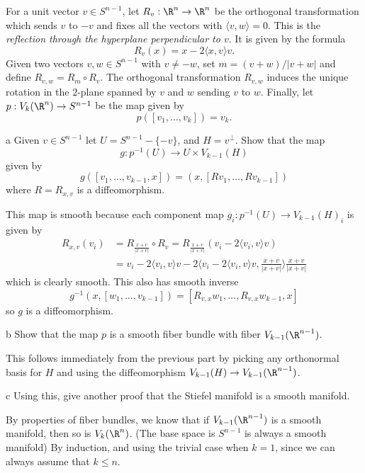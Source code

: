 \documentclass[11pt,letterpaper]{article}
\begin{document}
\begin{solution}
    For a unit vector $v\in S^{n-1}$, let $R_v : \R^n \to \R^n$ be the orthogonal transformation which sends $v$ to $-v$ and fixes all the vectors with $\big\langle v,w \big\rangle = 0$. This is the \emph{reflection through the hyperplane perpendicular to $v$}. It is given by the formula
    \[
        R_v(x) = x - 2\big\langle x,v \big\rangle v
    .\]
    Given two vectors $v,w\in S^{n-1}$ with $v\neq -w$, set $m=(v+w) /|v+w|$ and define $R_{v,w} = R_m\circ R_v$. The orthogonal transformation $R_{v,w}$ induces the unique rotation in the $2$-plane spanned by $v$ and $w$ sending $v$ to $w$. Finally, let $p : V_k(\R^n)\to S^{n-1}$ be the map given by
    \[
        p([v_1,\ldots,v_k])=v_k
    .\]  

    \begin{partproblem}{a}
        Given $v\in S^{n-1}$ let $U=S^{n-1}-\{-v\}$, and $H=v^\perp$. Show that the map
        \[
            g : p^{-1}(U)\to U\times V_{k-1}(H)
        \]
        given by
        \[
            g([v_1,\ldots,v_{k-1}, x]) = (x,[Rv_1, \ldots, Rv_{k-1}])
        \]
        where $R = R_{x,v}$ is a diffeomorphism.   
    \end{partproblem}
    \quad This map is smooth because each component map $g_i : p^{-1}(U)\to V_{k-1}(H)_i$ is given by
    \[
        \begin{aligned}
            R_{x,v}(v_i) &= R_{\frac{x+v}{|x+v|}}\circ R_v = R_{\frac{x+v}{|x+v|}}\left(v_i - 2\big\langle v_i, v \big\rangle v\right)\\
            &= v_i - 2\big\langle v_i, v \big\rangle v - 2\Bigg\langle v_i - 2\big\langle v_i, v \big\rangle v, \frac{x+v}{|x+v|} \Bigg\rangle \frac{x+v}{|x+v|}
        \end{aligned}
    \]  
    which is clearly smooth. This also has smooth inverse
    \[
        g^{-1}(x, [w_1,\ldots,v_{k-1}]) = [R_{v,x}w_1, \ldots, R_{v,x}w_{k-1}, x]
    \]
    so $g$ is a diffeomorphism. 

    \begin{partproblem}{b}
        Show that the map $p$ is a smooth fiber bundle with fiber $V_{k-1}(\R^{n-1})$.
    \end{partproblem}
    \quad This follows immediately from the previous part by picking any orthonormal basis for $H$ and using the diffeomorphism $V_{k-1}(H)\to V_{k-1}(\R^{n-1})$.

    \begin{partproblem}{c}
        Using this, give another proof that the Stiefel manifold is a smooth manifold.
    \end{partproblem}
    \quad By properties of fiber bundles, we know that if $V_{k-1}(\R^{n-1})$ is a smooth manifold, then so is $V_k(\R^n)$. (The base space is $S^{n-1}$ is always a smooth manifold) By induction, and using the trivial case when $k=1$, since we can always assume that $k\leq n$. 
\end{solution}
\end{document}
